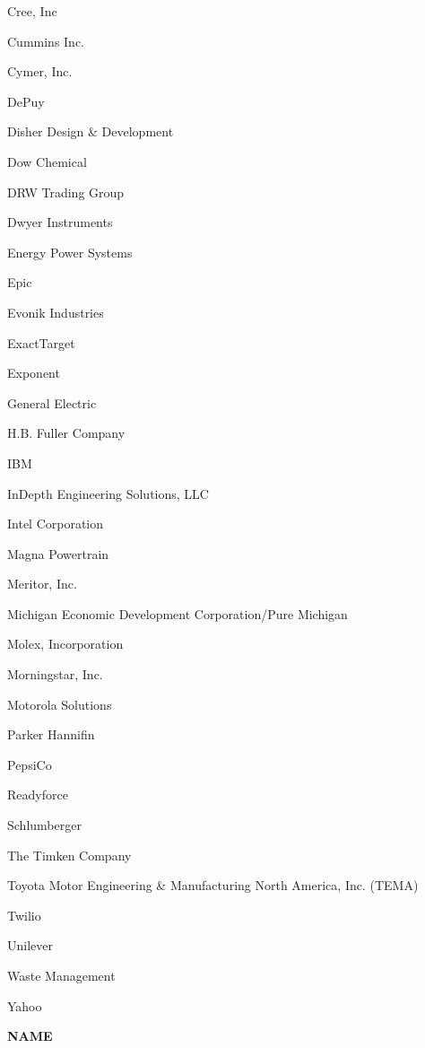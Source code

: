 \documentclass[twoside]{article}
\begin{document}
\begin{center}
\begin{multicols}{5}
\begin{FlushLeft}
\begin{compactitem}
\item Cree, Inc
\item Cummins Inc.
\item Cymer, Inc.
\item DePuy
\item Disher Design \& Development
\item Dow Chemical
\item DRW Trading Group
\item Dwyer Instruments
\item Energy Power Systems
\item Epic
\item Evonik Industries
\item ExactTarget
\item Exponent
\item General Electric
\item H.B. Fuller Company
\item IBM
\item InDepth Engineering Solutions, LLC
\item Intel Corporation
\item Magna Powertrain
\item Meritor, Inc.
\item Michigan Economic Development Corporation/Pure Michigan
\item Molex, Incorporation
\item Morningstar, Inc.
\item Motorola Solutions
\item Parker Hannifin
\item PepsiCo
\item Readyforce
\item Schlumberger
\item The Timken Company
\item Toyota Motor Engineering \& Manufacturing North America, Inc. (TEMA)
\item Twilio
\item Unilever
\item Waste Management
\item Yahoo
\end{compactitem}
        \end{FlushLeft}
        \vspace{1em}
        {\fontsize{14}{16}\selectfont \bf NAME}\\
        \vspace{-1em}
        ~\hrulefill~
        \vspace{-.9em}
        \begin{FlushLeft}

\end{FlushLeft}
\end{multicols}
\end{center}
\end{document}
